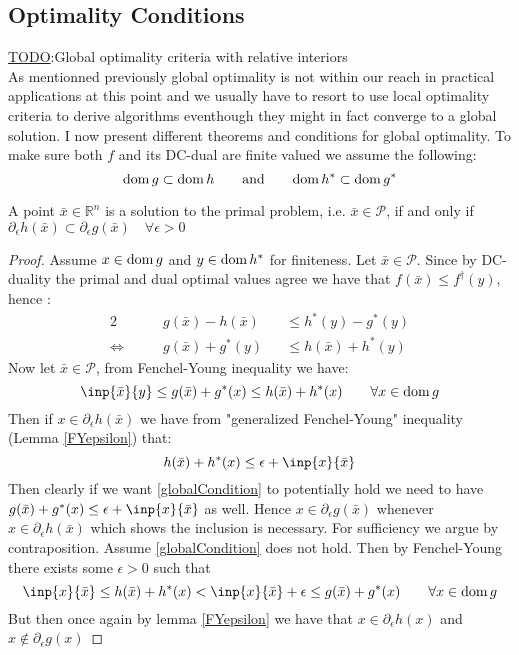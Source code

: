 \subsection{Optimality Conditions}
\underline{TODO}:Global optimality criteria with relative interiors 
\autocite{tao2005dc}\\

As mentionned previously global optimality is not within our
reach in practical applications at this point and we usually have to resort to
use local optimality criteria to derive algorithms eventhough they might 
in fact converge to a global solution. I now present different theorems
and conditions for global optimality. To make sure both $f$ and its DC-dual
are finite valued we assume the following:
\begin{equation}
	\mathrm{dom} \, g \subset \mathrm{dom} \, h \qquad\text{and}\qquad
	\mathrm{dom} \,   h^* \subset \mathrm{dom} \, g^*
\end{equation}

\begin{theorem}
A point $\bar x\in \mathbb R^n$ is a solution to the primal
problem, i.e. $\bar x\in \mathcal P$, if and only if 
$\partial_\epsilon h(\bar x) \subset \partial_\epsilon g(\bar x)\quad \forall
\epsilon >0$
\end{theorem}
\begin{proof}
Assume $x\in\mathrm{dom} \, g$ and $y\in\mathrm{dom} \, h^*$ for finiteness.
Let $\bar x \in \mathcal P$. Since by DC-duality
the primal and dual optimal values agree we have that  $f(\bar x) \leq
f^\dagger(y)$, hence : 
\begin{alignat}{2}
	&g(\bar x) -h(\bar x) &&\leq h^*(y)-g^*(y)\\
	\iff \qquad &g(\bar x) + g^*(y) &&\leq h(\bar x) + h^*(y) 
		     \label{globalCondition}
\end{alignat}
%
Now let $\bar x\in \mathcal P$, from Fenchel-Young inequality we have:
\begin{equation}
	\inp{\bar x}{y} \leq g(\bar x)+g^*(x)\leq h(\bar x)+h^*(x) \qquad
	\forall x\in\ddom g
\end{equation}
Then if $x\in\partial_\epsilon h(\bar x)$ we have from "generalized 
Fenchel-Young" inequality (Lemma \ref{FYepsilon}) that:
\begin{equation*}
	h(\bar x)+ h^*(x) \leq \epsilon + \inp{x}{\bar x}
\end{equation*}
Then clearly if we want \eqref{globalCondition} to potentially hold we need to
have $g(\bar x)+ g^*(x) \leq \epsilon + \inp{x}{\bar x}$
as well. Hence $x\in \partial_\epsilon g(\bar x)$ whenever $x\in
\partial_\epsilon h(\bar x)$ which shows the inclusion is necessary. For 
sufficiency we argue by contraposition. Assume \eqref{globalCondition} does not
hold. Then by Fenchel-Young there exists
some $\epsilon>0$ such that
\begin{equation*}
	\inp{x}{\bar x} \leq h(\bar x)+h^*(x)< \inp{x}{\bar x} + \epsilon 
	\leq g(\bar x) + g^*(x) \qquad \forall x\in\ddom g
\end{equation*}
But then once again by lemma \ref{FYepsilon} we have that
$x\in\partial_\epsilon h(x)$ and $x\not\in\partial_\epsilon g(x)$
\end{proof}
\clearpage

